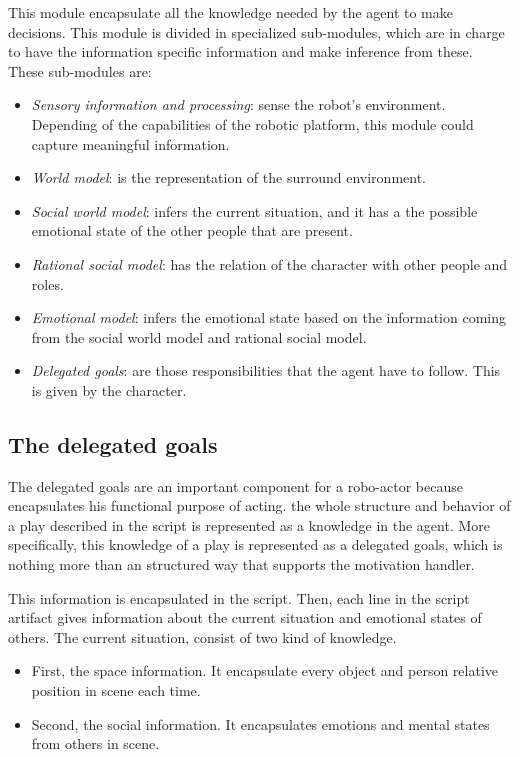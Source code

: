 This module encapsulate all the knowledge needed by the agent to make decisions. This module is divided in specialized sub-modules, which are in charge to have the information specific information and make inference from these. These sub-modules are:
\begin{itemize}
	\item \textit{Sensory information and processing}: sense the robot's environment. Depending of the capabilities of the robotic platform, this module could capture meaningful information.
	\item \textit{World model}: is the representation of the surround environment.
	\item \textit{Social world model}: infers the current situation, and it has a the possible emotional state of the other people that are present.
	\item \textit{Rational social model}: has the relation of the character with other people and roles.
	\item \textit{Emotional model}: infers the emotional state based on the information coming from the social world model and rational social model.
	\item \textit{Delegated goals}: are those responsibilities that the agent have to follow. This is given by the character. 
\end{itemize}
\subsection{The delegated goals}
The delegated goals are an important component for a robo-actor because encapsulates his functional purpose of acting. the whole structure and behavior of a play described in the script is represented as a knowledge in the agent. More specifically, this knowledge of a play is represented as a delegated goals, which is nothing more than an structured way that supports the motivation handler. 

This information is encapsulated in the script. Then, each line in the script artifact gives information about the current situation and emotional states of others. The current situation, consist of two kind of knowledge. 

\begin{itemize}
\item First, the space information. It encapsulate every object and person relative position in scene each time. 

\item Second, the social information. It encapsulates emotions and mental states from others in scene.
\end{itemize}


